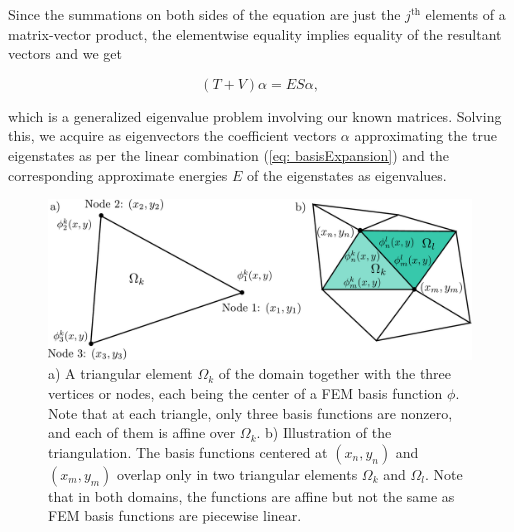 \documentclass[a4paper,12pt]{article}
\begin{document}
Since the summations on both sides of the equation are just the $j^{\text{th}}$ elements of a matrix-vector product, the elementwise equality implies equality of the resultant vectors and we get

\begin{equation}
\label{eq: matrixFormFEMeq}
(T + V)\alpha = ES\alpha,
\end{equation}

which is a generalized eigenvalue problem involving our known matrices. Solving this, we acquire as eigenvectors the coefficient vectors $\alpha$ approximating the true eigenstates as per the linear combination (\ref{eq: basisExpansion}) and the corresponding approximate energies $E$ of the eigenstates as eigenvalues.





\begin{figure}[H]
\centering
\includegraphics[width=\textwidth]{../figs/triangle.pdf}
\caption{a) A triangular element $\Omega_k$ of the domain together with the three vertices or nodes, each being the center of a FEM basis function $\phi$. Note that at each triangle, only three basis functions are nonzero, and each of them is affine over $\Omega_k$. b) Illustration of the triangulation. The basis functions centered at $(x_n, y_n)$ and $(x_m, y_m)$ overlap only in two triangular elements $\Omega_k$ and $\Omega_l$. Note that in both domains, the functions are affine but not the same as FEM basis functions are piecewise linear.}
\label{fig: triangles}
\end{figure}

\end{document}

